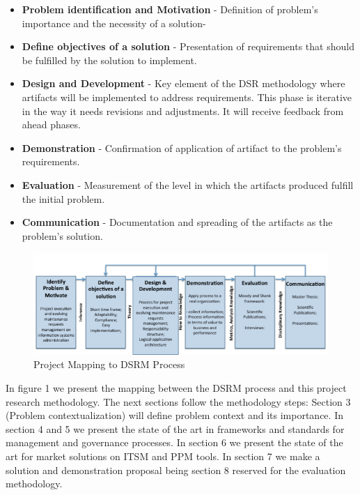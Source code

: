 \begin{itemize}
  \item \textbf{Problem identification and Motivation} - Definition of problem's importance and the necessity of a solution-
  \item \textbf{Define objectives of a solution} - Presentation of requirements that should be fulfilled by the solution to implement. 
  \item \textbf{Design and Development} - Key element of the DSR methodology where artifacts will be implemented to address requirements. This phase is iterative in the way it needs revisions and adjustments. It will receive feedback from ahead phases.
  \item \textbf{Demonstration} -  Confirmation of application of artifact to the problem's requirements.
  \item \textbf{Evaluation} - Measurement of the level in which the artifacts produced fulfill the initial problem.
  \item \textbf{Communication} - Documentation and spreading of the artifacts as the problem's solution.
\end{itemize}

\begin{figure}[h!]
\centering
\includegraphics[width=\textwidth]{img/DSRMProcessMapping.png}
\caption{Project Mapping to DSRM Process}
\end{figure}


In figure 1 we present the mapping between the DSRM process and this project research methodology. The next sections follow the methodology steps: Section 3 (Problem contextualization) will define problem context and its importance. In section 4 and 5 we present the state of the art in frameworks and standards for management and governance processes. In section 6 we present the state of the art for market solutions on ITSM and PPM tools. In section 7 we make a solution and demonstration proposal being section 8 reserved for the evaluation methodology.\par


